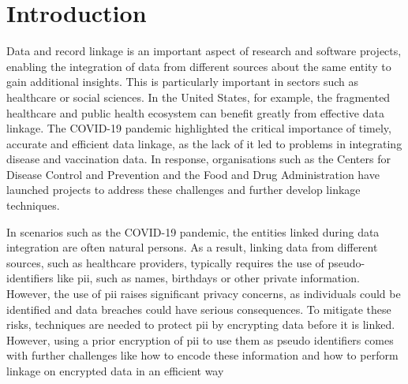 
\chapter{Introduction}  \label{sec:introduction}
Data and record linkage is an important aspect of research and software projects, enabling the integration of data from different sources about the same entity to gain additional insights.
This is particularly important in sectors such as healthcare or social sciences.
In the United States, for example, the fragmented healthcare and public health ecosystem can benefit greatly from effective data linkage.
The COVID-19 pandemic highlighted the critical importance of timely, accurate and efficient data linkage, as the lack of it led to problems in integrating disease and vaccination data.
In response, organisations such as the Centers for Disease Control and Prevention and the Food and Drug Administration have launched projects to address these challenges and further develop linkage techniques. \cite{pathak2024privacy}

In scenarios such as the COVID-19 pandemic, the entities linked during data integration are often natural persons.
As a result, linking data from different sources, such as healthcare providers, typically requires the use of pseudo-identifiers like \ac{pii}, such as names, birthdays or other private information.
However, the use of \ac{pii} raises significant privacy concerns, as individuals could be identified and data breaches could have serious consequences.
To mitigate these risks, techniques are needed to protect \ac{pii} by encrypting data before it is linked.
However, using a prior encryption of \ac{pii} to use them as pseudo identifiers comes with further challenges like how to encode these information and how to perform linkage on encrypted data in an efficient way \cite{}

